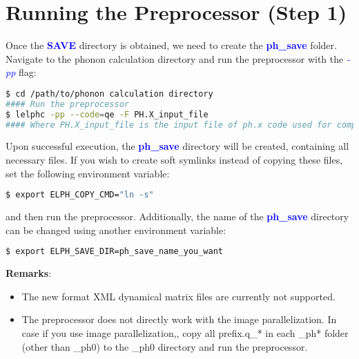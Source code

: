 \documentclass[12pt,twoside,openany]{book}
\begin{document}
\section{Running the Preprocessor (Step 1)}
Once the \textcolor{blue}{\bf{SAVE}} directory is obtained, we need to create the \textcolor{blue}{\bf{ph\_save}} folder. Navigate to the phonon calculation directory and run the preprocessor with the \textcolor{blue}{\emph{-pp}} flag:
\begin{lstlisting}[language=bash]
$ cd /path/to/phonon calculation directory
#### Run the preprocessor
$ lelphc -pp --code=qe -F PH.X_input_file
#### Where PH.X_input_file is the input file of ph.x code used for computing phonons
\end{lstlisting}
Upon successful execution, the \textcolor{blue}{\bf{ph\_save}} directory will be created, containing all necessary files.
If you wish to create soft symlinks instead of copying these files, set the following environment variable:
\begin{lstlisting}[language=bash]
$ export ELPH_COPY_CMD="ln -s"
\end{lstlisting}
and then run the preprocessor.
Additionally, the name of the \textcolor{blue}{\bf{ph\_save}} directory can be changed using another environment variable:
\begin{lstlisting}[language=bash]
$ export ELPH_SAVE_DIR=ph_save_name_you_want
\end{lstlisting}
\textbf{Remarks}:
\begin{itemize}
\item The new format XML dynamical matrix files are currently not supported.
\item The preprocessor does not directly work with the image parallelization. In case if you use image parallelization,, copy all prefix.q\_* in each \_ph* folder (other than \_ph0) to the \_ph0 directory 
and run the preprocessor.
\end{itemize}
\end{document}
